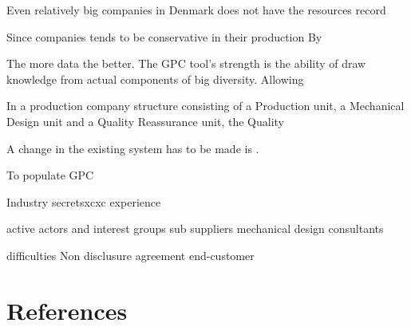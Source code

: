 \documentclass[aip,amsmath, reprint, author-year]{revtex4-1}
\begin{document}
Even relatively big companies in Denmark does not have the resources record 

Since companies tends to be conservative in their production 
By 

The more data the better. The GPC tool's strength is the ability of draw knowledge from actual components of big diversity. Allowing  

In a production company structure consisting of a Production unit, a Mechanical Design unit and a Quality Reassurance unit, the Quality 

A change in the existing system has to be made is .
 

\cite{perzyk1998selection}

To populate GPC 

Industry secretsxcxc
	experience
	
	
active actors and interest groups
	sub suppliers 
	mechanical design consultants
	

difficulties
	Non disclusure agreement
	end-customer
	

\section*{References}

\end{document}
